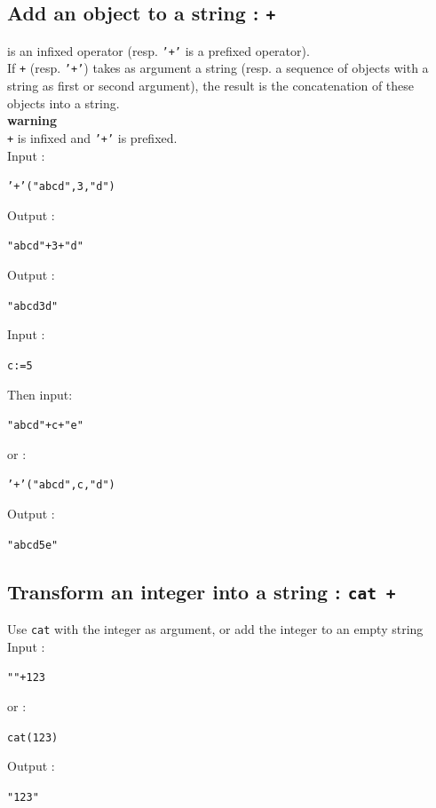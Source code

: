 \documentclass[a4paper,11pt]{book}
\begin{document}
\subsection{Add an object to a string : {\tt +}}\index{+}
\noindent {\tt +} is an infixed operator (resp. {\tt '+'} is a prefixed 
operator).\\
If  {\tt +} (resp.  {\tt '+'}) takes as argument a string (resp.
a sequence of objects with a string as first or second argument), 
the result is the concatenation of these objects into a string.\\
{\bf warning}\\
{\tt +} is infixed and {\tt '+'} is prefixed.\\ 
Input :
\begin{center}{\tt '+'("abcd",3,"d")}\end{center}
Output :
\begin{center}{\tt "abcd"+3+"d"}\end{center}
Output :
\begin{center}{\tt  "abcd3d"}\end{center}
Input :
\begin{center}{\tt c:=5}\end{center}
Then input:
\begin{center}{\tt "abcd"+c+"e"}\end{center}
or :
\begin{center}{\tt '+'("abcd",c,"d")}\end{center}
Output :
\begin{center}{\tt  "abcd5e"}\end{center}

\subsection{Transform an integer into a string : {\tt cat +}}\index{+}
\noindent Use {\tt cat} with the integer as argument, or add the integer
to an empty string\\
Input :
\begin{center}{\tt ""+123}\end{center}
or :
\begin{center}{\tt cat(123)}\end{center}
Output :
\begin{center}{\tt  "123"}\end{center}
\end{document}
